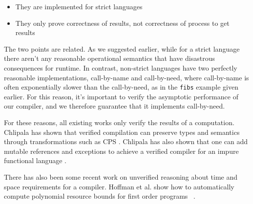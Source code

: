 \begin{itemize}
\item They are implemented for strict languages
\item They only prove correctness of results, not correctness of process to get
results
\end{itemize}

The two points are related. As we suggested earlier, while for a strict language
there aren't any reasonable operational semantics that have disastrous
consequences for runtime. In contrast, non-strict languages have two perfectly
reasonable implementations, call-by-name and call-by-need, where call-by-name is
often exponentially slower than the call-by-need, as in the \texttt{fibs}
example given earlier. For this reason, it's important to verify the asymptotic
performance of our compiler, and we therefore guarantee that it implements
call-by-need. 

For these reasons, all existing works only verify the results of a computation.
Chlipala has shown that verified compilation can preserve types and semantics
through transformations such as CPS \cite{chlipala}. Chlipala has also shown
that one can add mutable references and exceptions to achieve a verified
compiler for an impure functional language \cite{chlipalaimpure}.  

There has also been some recent work on unverified reasoning about time and
space requirements for a compiler. Hoffman et al. show how to automatically
compute polynomial resource bounds for first order programs
~\cite{hoffmanresource}. 


